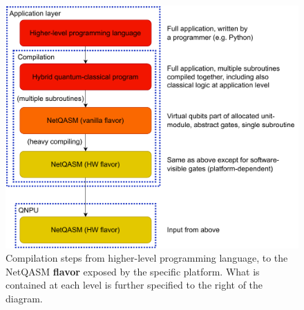 \begin{figure}
      \centering
      \includegraphics[width=0.7\linewidth]{figures/netqasm/comp-chain.pdf}
      \caption{Compilation steps from higher-level programming language, to the
            \ac{NetQASM} \textbf{flavor} exposed by the specific platform. What is
            contained at each level is further specified to the right of the
            diagram.}
      \label{fig:comp_chain}
\end{figure}

